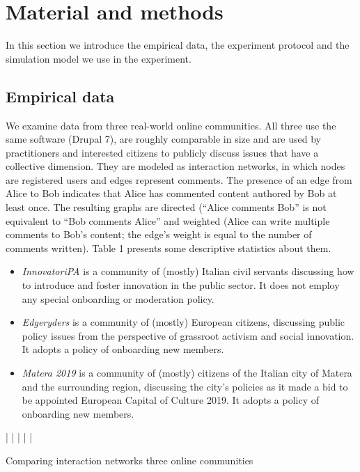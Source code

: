\section{Material and methods}

In this section we introduce the empirical data, the experiment protocol and the simulation model we use in the experiment. 

\subsection{Empirical data}

We examine data from three real-world online communities. All three use the same software (Drupal 7), are roughly comparable in size and are used by practitioners and interested citizens to publicly discuss issues that have a collective dimension. They are modeled as interaction networks, in which nodes are registered users and edges represent comments. The presence of an edge from Alice to Bob indicates that Alice has commented content authored by Bob at least once. The resulting graphs are directed (“Alice comments Bob” is not equivalent to “Bob comments Alice” and weighted (Alice can write multiple comments to Bob's content; the edge's weight is equal to the number of comments written). Table 1 presents some descriptive statistics about them. 

\begin{itemize}
\item \emph{InnovatoriPA} is a community of (mostly) Italian civil servants discussing how to introduce and foster innovation in the public sector. It does not employ any special onboarding or moderation policy.
\item \emph{Edgeryders} is a community of (mostly) European citizens, discussing public policy issues from the perspective of grassroot activism and social innovation. It adopts a policy of onboarding new members.
\item \emph{Matera 2019} is a community of (mostly) citizens of the Italian city of Matera and the surrounding region, discussing the city's policies as it made a bid to be appointed European Capital of Culture 2019. It adopts a policy of onboarding new members.
\end{itemize}

\begin{table}{| | | | |}
\caption{Comparing interaction networks three online communities}
\end{table}

